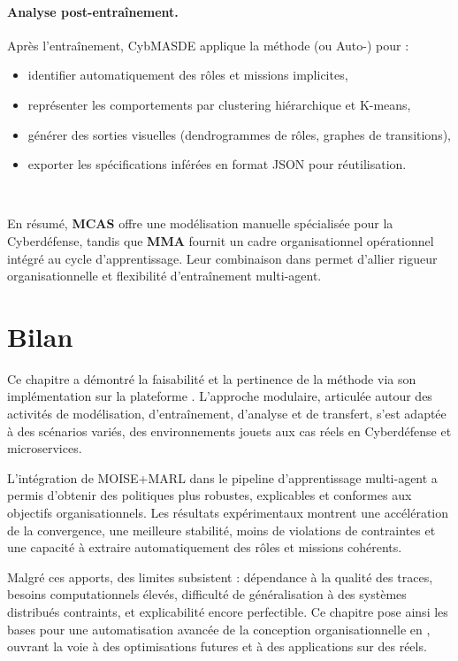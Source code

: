 \paragraph{Analyse post-entraînement.}
Après l’entraînement, CybMASDE applique la méthode  (ou Auto-) pour :
\begin{itemize}
  \item identifier automatiquement des rôles et missions implicites,
  \item représenter les comportements par clustering hiérarchique et K-means,
  \item générer des sorties visuelles (dendrogrammes de rôles, graphes de transitions),
  \item exporter les spécifications inférées en format JSON pour réutilisation.
\end{itemize}

\

En résumé, \textbf{MCAS} offre une modélisation manuelle spécialisée pour la Cyberdéfense, tandis que \textbf{MMA} fournit un cadre organisationnel opérationnel intégré au cycle d’apprentissage. Leur combinaison dans  permet d’allier rigueur organisationnelle et flexibilité d’entraînement multi-agent.


\section{Bilan}

Ce chapitre a démontré la faisabilité et la pertinence de la méthode  via son implémentation sur la plateforme . L'approche modulaire, articulée autour des activités de modélisation, d'entraînement, d'analyse et de transfert, s'est adaptée à des scénarios variés, des environnements jouets aux cas réels en Cyberdéfense et microservices.

L'intégration de MOISE+MARL dans le pipeline d'apprentissage multi-agent a permis d'obtenir des politiques plus robustes, explicables et conformes aux objectifs organisationnels. Les résultats expérimentaux montrent une accélération de la convergence, une meilleure stabilité, moins de violations de contraintes et une capacité à extraire automatiquement des rôles et missions cohérents.

Malgré ces apports, des limites subsistent : dépendance à la qualité des traces, besoins computationnels élevés, difficulté de généralisation à des systèmes distribués contraints, et explicabilité encore perfectible. Ce chapitre pose ainsi les bases pour une automatisation avancée de la conception organisationnelle en , ouvrant la voie à des optimisations futures et à des applications sur des  réels.

